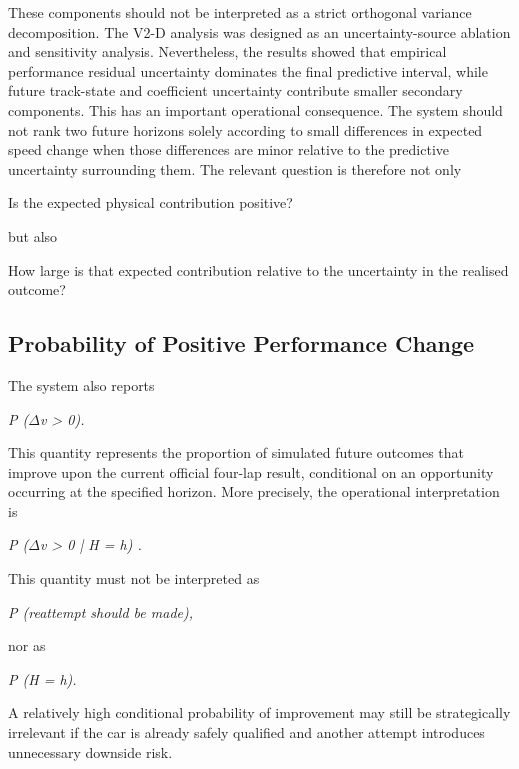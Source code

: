 These components should not be interpreted as a strict orthogonal variance decomposition. The V2-D analysis was designed as an uncertainty-source ablation and sensitivity analysis. Nevertheless, the results showed that empirical performance residual uncertainty dominates the final predictive interval, while future track-state and coefficient uncertainty contribute smaller secondary components. This has an important operational consequence. The system should not rank two future horizons solely according to small differences in expected speed change when those differences are minor relative to the predictive uncertainty surrounding them. The relevant question is therefore not only

Is the expected physical contribution positive?

but also

How large is that expected contribution relative to the uncertainty in the realised outcome?

\subsection{Probability of Positive Performance Change}
The system also reports

\begin{center}\textit{P (\ensuremath{\Delta}v > 0).}\end{center}

This quantity represents the proportion of simulated future outcomes that improve upon the current official four-lap result, conditional on an opportunity occurring at the specified horizon. More precisely, the operational interpretation is

\begin{center}\textit{P (\ensuremath{\Delta}v > 0 | H = h) .}\end{center}

This quantity must not be interpreted as

\begin{center}\textit{P (reattempt should be made),}\end{center}

nor as

\begin{center}\textit{P (H = h).}\end{center}

A relatively high conditional probability of improvement may still be strategically irrelevant if the car is already safely qualified and another attempt introduces unnecessary downside risk.

